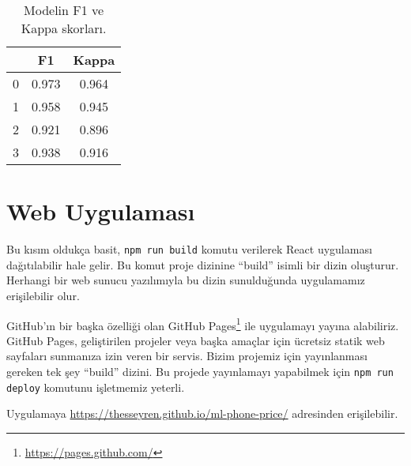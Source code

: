 \documentclass[a4paper,12pt]{article}
\begin{document}
\begin{table}[h]
 \center
 \renewcommand{\arraystretch}{1.2}
 \begin{tabular}{ c|cc }
 & F1 & Kappa \\
 \hline
 0 & 0.973 & 0.964 \\
 1 & 0.958 & 0.945 \\
 2 & 0.921 & 0.896 \\
 3 & 0.938 & 0.916 \\
 \end{tabular}
 \renewcommand{\arraystretch}{1}
 \caption{Modelin F1 ve Kappa skorları.}
\end{table}


\section{Web Uygulaması}

Bu kısım oldukça basit, \texttt{npm run build} komutu verilerek React uygulaması dağıtılabilir hale gelir.
Bu komut proje dizinine ``build'' isimli bir dizin oluşturur.
Herhangi bir web sunucu yazılımıyla bu dizin sunulduğunda uygulamamız erişilebilir olur.

GitHub'ın bir başka özelliği olan GitHub Pages\footnote{\url{https://pages.github.com/}} ile uygulamayı yayına alabiliriz.
GitHub Pages, geliştirilen projeler veya başka amaçlar için ücretsiz statik web sayfaları sunmanıza izin veren bir servis.
Bizim projemiz için yayınlanması gereken tek şey ``build'' dizini.
Bu projede yayınlamayı yapabilmek için \texttt{npm run deploy} komutunu işletmemiz yeterli.

Uygulamaya \url{https://thesseyren.github.io/ml-phone-price/} adresinden erişilebilir.
\end{document}
